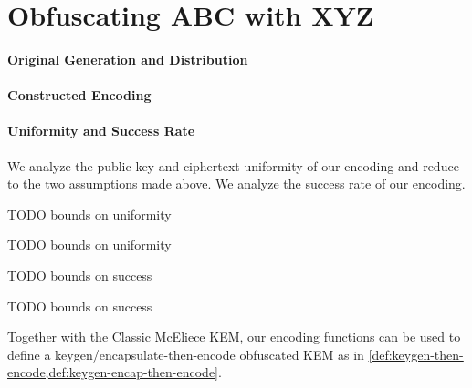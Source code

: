 \section{Obfuscating ABC with XYZ} \label{sec:tbd}
\paragraph{Original Generation and Distribution}
\paragraph{Constructed Encoding}
\paragraph{Uniformity and Success Rate}

We analyze the public key and ciphertext uniformity of our encoding and reduce to the two assumptions made above. We analyze the success rate of our encoding.

\begin{lemma} \label{lem:tbd-pk-unif}
    TODO bounds on uniformity
\end{lemma}

\begin{lemma} \label{lem:tbd-ctxt-unif}
    TODO bounds on uniformity
\end{lemma}

\begin{lemma} \label{lem:tbd-first-keygen-success}
    TODO bounds on success
\end{lemma}

\begin{lemma}[[First-encap success probability of TODO TBD] \label{lem:tbd-first-encap-success}
    TODO bounds on success
\end{lemma}

Together with the Classic McEliece KEM, our encoding functions can be used to define a keygen/encapsulate-then-encode obfuscated KEM as in \cref{def:keygen-then-encode,def:keygen-encap-then-encode}.


